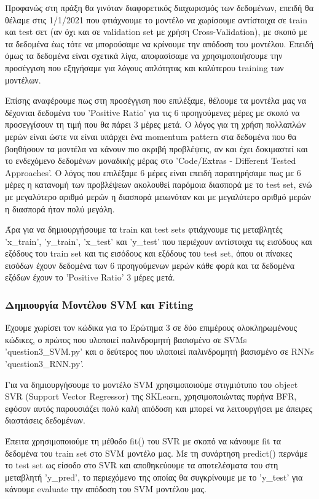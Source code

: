 \documentclass[12pt,a4paper]{article}
\begin{document}
Προφανώς στη πράξη θα γινόταν διαφορετικός διαχωρισμός των δεδομένων, επειδή θα θέλαμε στις 1/1/2021 που φτιάχνουμε το μοντέλο να χωρίσουμε αντίστοιχα σε train και test σετ (αν όχι και σε validation set με χρήση Cross-Validation), με σκοπό με τα δεδομένα έως τότε να μπορούσαμε να κρίνουμε την απόδοση του μοντέλου. Επειδή όμως τα δεδομένα είναι σχετικά λίγα, αποφασίσαμε να χρησιμοποιήσουμε την προσέγγιση που εξηγήσαμε για λόγους απλότητας και καλύτερου training των μοντέλων.

Επίσης αναφέρουμε πως στη προσέγγιση που επιλέξαμε, θέλουμε τα μοντέλα μας να δέχονται δεδομένα του 'Positive Ratio' για τις 6 προηγούμενες μέρες με σκοπό να προσεγγίσουν τη τιμή που θα πάρει 3 μέρες μετά. Ο λόγος για τη χρήση πολλαπλών μερών είναι ώστε να είναι υπάρχει ένα momentum pattern στα δεδομένα που θα βοηθήσουν τα μοντέλα να κάνουν πιο ακριβή προβλέψεις, αν και έχει δοκιμαστεί και το ενδεχόμενο δεδομένων μοναδικής μέρας στο 'Code/Extras - Different Tested Approaches'. Ο λόγος που επιλέξαμε 6 μέρες είναι επειδή παρατηρήσαμε πως με 6 μέρες η κατανομή των προβλέψεων ακολουθεί παρόμοια διασπορά με το test set, ενώ με μεγαλύτερο αριθμό μερών η διασπορά μειωνόταν και με μεγαλύτερο αριθμό μερών η διασπορά ήταν πολύ μεγάλη.

Άρα για να δημιουργήσουμε τα train και test sets φτιάχνουμε τις μεταβλητές 'x\_train', 'y\_train', 'x\_test' και 'y\_test' που περιέχουν αντίστοιχα τις εισόδους και εξόδους του train set και τις εισόδους και εξόδους του test set, όπου οι πίνακες εισόδων έχουν δεδομένα των 6 προηγούμενων μερών κάθε φορά και τα δεδομένα εξόδων έχουν το 'Positive Ratio' 3 μέρες μετά.

\subsubsection{Δημιουργία Μοντέλου SVM και Fitting}

Έχουμε χωρίσει τον κώδικα για το Ερώτημα 3 σε δύο επιμέρους ολοκληρωμένους κώδικες, ο πρώτος που υλοποιεί παλινδρομητή βασισμένο σε SVMs 'question3\_SVM.py' και ο δεύτερος που υλοποιεί παλινδρομητή βασισμένο σε RNNs 'question3\_RNN.py'.

Για να δημιουργήσουμε το μοντέλο SVM χρησιμοποιούμε στιγμιότυπο του object SVR (Support Vector Regressor) της SKLearn, χρησιμοποιώντας πυρήνα BFR, εφόσον αυτός παρουσιάζει πολύ καλή απόδοση και μπορεί να λειτουργήσει με άπειρες διαστάσεις δεδομένων.

Έπειτα χρησιμοποιούμε τη μέθοδο fit() του SVR με σκοπό να κάνουμε fit τα δεδομένα του train set στο SVM μοντέλο μας. Με τη συνάρτηση predict() περνάμε το test set ως είσοδο στο SVR και αποθηκεύουμε τα αποτελέσματα του στη μεταβλητή 'y\_pred', το περιεχόμενο της οποίας θα συγκρίνουμε με το 'y\_test' για κάνουμε evaluate την απόδοση του SVM μοντέλου μας.
\end{document}
